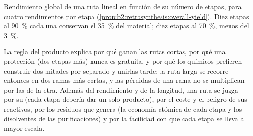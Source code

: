 \begin{omfigure}
\par\vspace{4pt}

{\small Rendimiento global de una ruta lineal en función de su número de etapas, para cuatro rendimientos por etapa
(\cref{prop:b2:retrosynthesis:overall-yield}). Diez etapas al 90~\% cada una conservan el 35~\% del material; diez
etapas al 70~\%, menos del 3~\%.}
\end{omfigure}

La regla del producto explica por qué ganan las rutas cortas, por qué una protección (dos etapas más) nunca es gratuita, y por qué
los químicos prefieren construir dos mitades por separado y unirlas tarde: la ruta larga se recorre entonces en dos
ramas más cortas, y las pérdidas de una rama no se multiplican por las de la otra. Además del rendimiento y de la
longitud, una ruta se juzga por su  (cada etapa debería dar un solo producto), por el coste y el peligro
de sus reactivos, por los residuos que genera (la economía atómica de cada etapa y los disolventes de las
purificaciones) y por la facilidad con que cada etapa se lleva a mayor escala.


